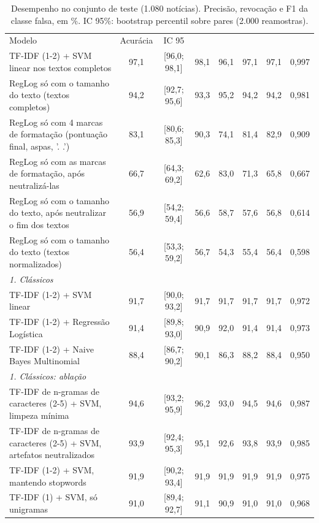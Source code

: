 \begin{table}[t]
\centering\small
\caption{Desempenho no conjunto de teste (1.080 notícias). Precisão, revocação e F1 da classe falsa, em \%. IC 95\%: bootstrap percentil sobre pares (2.000 reamostras).}
\label{tab:resultados}
\begin{tabular}{lccccccc}
\toprule
Modelo & Acurácia & IC 95%
\midrule
\multicolumn{8}{l}{\textit{0. Atalhos}} \\
TF-IDF (1-2) + SVM linear nos textos completos & 97,1 & [96,0; 98,1] & 98,1 & 96,1 & 97,1 & 97,1 & 0,997 \\
RegLog só com o tamanho do texto (textos completos) & 94,2 & [92,7; 95,6] & 93,3 & 95,2 & 94,2 & 94,2 & 0,981 \\
RegLog só com 4 marcas de formatação (pontuação final, aspas, '. .') & 83,1 & [80,6; 85,3] & 90,3 & 74,1 & 81,4 & 82,9 & 0,909 \\
RegLog só com as marcas de formatação, após neutralizá-las & 66,7 & [64,3; 69,2] & 62,6 & 83,0 & 71,3 & 65,8 & 0,667 \\
RegLog só com o tamanho do texto, após neutralizar o fim dos textos & 56,9 & [54,2; 59,4] & 56,6 & 58,7 & 57,6 & 56,8 & 0,614 \\
RegLog só com o tamanho do texto (textos normalizados) & 56,4 & [53,3; 59,2] & 56,7 & 54,3 & 55,4 & 56,4 & 0,598 \\
\multicolumn{8}{l}{\textit{1. Clássicos}} \\
TF-IDF (1-2) + SVM linear & 91,7 & [90,0; 93,2] & 91,7 & 91,7 & 91,7 & 91,7 & 0,972 \\
TF-IDF (1-2) + Regressão Logística & 91,4 & [89,8; 93,0] & 90,9 & 92,0 & 91,4 & 91,4 & 0,973 \\
TF-IDF (1-2) + Naive Bayes Multinomial & 88,4 & [86,7; 90,2] & 90,1 & 86,3 & 88,2 & 88,4 & 0,950 \\
\multicolumn{8}{l}{\textit{1. Clássicos: ablação}} \\
TF-IDF de n-gramas de caracteres (2-5) + SVM, limpeza mínima & 94,6 & [93,2; 95,9] & 96,2 & 93,0 & 94,5 & 94,6 & 0,987 \\
TF-IDF de n-gramas de caracteres (2-5) + SVM, artefatos neutralizados & 93,9 & [92,4; 95,3] & 95,1 & 92,6 & 93,8 & 93,9 & 0,985 \\
TF-IDF (1-2) + SVM, mantendo stopwords & 91,9 & [90,2; 93,4] & 91,9 & 91,9 & 91,9 & 91,9 & 0,975 \\
TF-IDF (1) + SVM, só unigramas & 91,0 & [89,4; 92,7] & 91,1 & 90,9 & 91,0 & 91,0 & 0,968 \\

\end{tabular}
\end{table}
